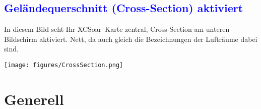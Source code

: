 \documentclass[german,a4paper,12pt,utf8]{scrreprt}
\newcommand{\xc}{{\textsf XCSoar}}
\begin{document}
\subsection*{\textcolor{blue}{Geländequerschnitt (Cross-Section) aktiviert}}
In diesem Bild seht Ihr \xc~Karte zentral, Cross-Section am unteren Bildschirm aktiviert. Nett, da auch gleich die Bezeichnungen 
der Lufträume dabei sind.
\begin{center}
 \texttt{[image: figures/CrossSection.png]}
\end{center}
\newpage\section{Generell}\label{ch:generell}
\end{document}

